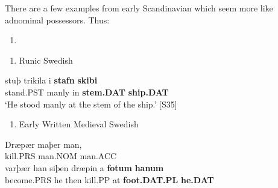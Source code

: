 There are a few examples from early Scandinavian which seem more like adnominal possessors. Thus:

\begin{enumerate} %
\item 
\end{enumerate} %
\setcounter{listLFOxcviiileveli}{0}
\begin{enumerate} %
\item 
Runic Swedish

\end{enumerate} %
\ea\label{}
\gll stuþ  trikila  i  \textbf{stafn} \textbf{skibi}\\


stand.PST  manly  in  \textbf{stem.DAT} \textbf{ship.DAT}\\ %


‘He stood manly at the stem of the ship.’ [S35]
\z

\begin{enumerate} %
\item 
\label{bkm:Ref95296719}Early Written Medieval Swedish

\end{enumerate} %
\ea\label{}
\gll Dræpær  maþer  man,\\


kill.PRS  man.NOM  man.ACC\\ %


\ea\label{}
\gll varþær  han  siþen  dræpin  a  \textbf{fotum} \textbf{hanum}\\


become.PRS  he  then  kill.PP  at  \textbf{foot.DAT.PL} \textbf{he.DAT}\\ %



